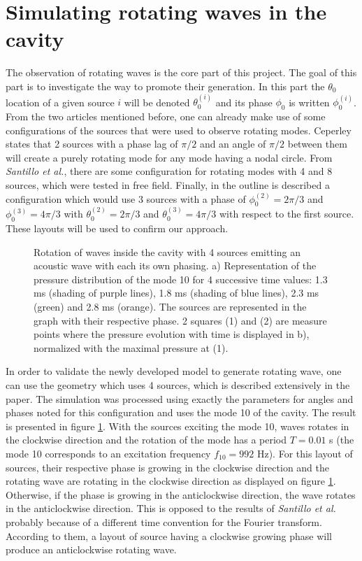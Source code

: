 \documentclass[%
 reprint,
 amsmath,amssymb,
 aps,
]{revtex4-2}
\begin{document}
\section{Simulating rotating waves in the cavity}
The observation of rotating waves is the core part of this project. The goal of this part is to investigate the way to promote their generation. In this part the $\theta_0$ location of a given source $i$ will be denoted $\theta_0^{(i)}$ and its phase $\phi_0$ is written $\phi_0^{(i)}$. From the two articles mentioned before, one can already make use of some configurations of the sources that were used to observe rotating modes. Ceperley states \cite{ceperley2002, ceperley1995} that 2 sources with a phase lag of $\pi/2$ and an angle of $\pi/2$ between them will create a purely rotating mode for any mode having a nodal circle. From \emph{Santillo et al.}, there are some configuration for rotating modes with 4 and 8 sources, which were tested in free field. Finally, in the outline is described a configuration which would use 3 sources with a phase of $\phi_0^{(2)} = 2\pi/3$ and $\phi_0^{(3)} = 4\pi/3$ with $\theta_0^{(2)} = 2\pi/3$ and $\theta_0^{(3)} = 4\pi/3$ with respect to the first source. These layouts will be used to confirm our approach.

\begin{figure}[b]
   \centering 
   \def\svgwidth{0.45\textwidth}
   
   \caption{Rotation of waves inside the cavity with 4 sources emitting an acoustic wave with each its own phasing. a) Representation of the pressure distribution of the mode 10 for 4 successive time values: 1.3 ms (shading of purple lines), 1.8 ms (shading of blue lines), 2.3 ms (green) and 2.8 ms (orange). The sources are represented in the graph with their respective phase. 2 squares (1) and (2) are measure points where the pressure evolution with time is displayed in b), normalized with the maximal pressure at (1).} 
   \label{fig:contour_time}
\end{figure}

In order to validate the newly developed model to generate rotating wave, one can use the geometry which uses 4 sources, which is described extensively in the paper. The simulation was processed using exactly the parameters for angles and phases noted for this configuration and uses the mode 10 of the cavity. The result is presented in figure \ref{fig:contour_time}. With the sources exciting the mode 10, waves rotates in the clockwise direction and the rotation of the mode has a period $T = 0.01$ s (the mode 10 corresponds to an excitation frequency $f_{10} = 992$ Hz). For this layout of sources, their respective phase is growing in the clockwise direction and the rotating wave are rotating in the clockwise direction as displayed on figure \ref{fig:contour_time}. Otherwise, if the phase is growing in the anticlockwise direction, the wave rotates in the anticlockwise direction. This is opposed to the results of \emph{Santillo et al.} probably because of a different time convention for the Fourier transform. According to them, a layout of source having a clockwise growing phase will produce an anticlockwise rotating wave.
\end{document}
